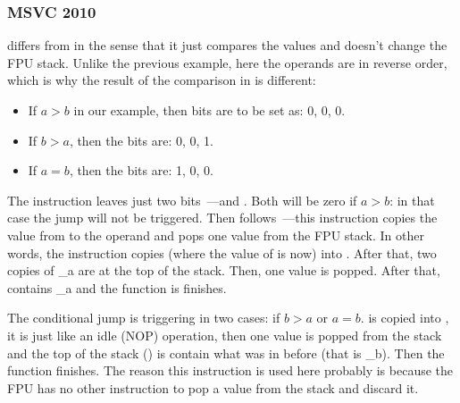 \subsubsection{\Optimizing MSVC 2010}




\FCOM differs from \FCOMP in the sense that it just compares the values and doesn't change the FPU stack. 
Unlike the previous example, here the operands are in reverse order, 
which is why the result of the comparison in \CThreeBits is different:

\begin{itemize}
\item If $a>b$ in our example, then \CThreeBits bits are to be set as: 0, 0, 0.
\item If $b>a$, then the bits are: 0, 0, 1.
\item If $a=b$, then the bits are: 1, 0, 0.
\end{itemize}

The  instruction leaves just two bits~---\Cthree and \Czero. 
Both will be zero if $a>b$: in that case the \JNE jump will not be triggered. 
Then  follows~---this instruction copies the value from  to the operand and 
pops one value from the FPU stack.
In other words, the instruction copies  (where the value of  is now) into .
After that, two copies of {\_a} are at the top of the stack. 
Then, one value is popped.
After that,  contains {\_a} and the function is finishes.

The conditional jump \JNE is triggering in two cases: if $b>a$ or $a=b$. 
 is copied into , it is just like an idle (\ac{NOP}) operation, then one value 
is popped from the stack and the top of the stack () is contain what was in  before 
(that is {\_b}). 
Then the function finishes. 
The reason this instruction is used here probably is because the \ac{FPU} 
has no other instruction to pop a value from the stack and discard it.


